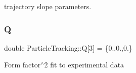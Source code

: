 trajectory slope parameters. \mbox{\label{namespaceParticleTracking_a3e89510a540596b235a808915deb0f7a}} 
\subsubsection{\texorpdfstring{Q}{Q}}
{\footnotesize\ttfamily double Particle\+Tracking\+::Q\mbox{[}3\mbox{]} = \{0.,0.,0.\}}

Form factor$^\wedge$2 fit to experimental data 